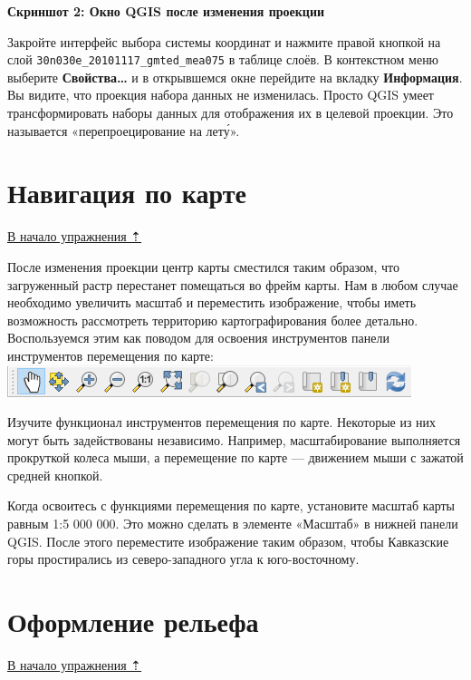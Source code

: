 \documentclass[
  12pt,
]{book}
\begin{document}
\textbf{Скриншот 2: Окно QGIS после изменения проекции}

Закройте интерфейс выбора системы координат и нажмите правой кнопкой на слой \texttt{30n030e\_20101117\_gmted\_mea075} в таблице слоёв. В контекстном меню выберите \textbf{Свойства\ldots{}} и в открывшемся окне перейдите на вкладку \textbf{Информация}. Вы видите, что проекция набора данных не изменилась. Просто QGIS умеет трансформировать наборы данных для отображения их в целевой проекции. Это называется «перепроецирование на лету́».

\hypertarget{map-design-general-navigation}{%
\section{Навигация по карте}\label{map-design-general-navigation}}

\protect\hyperlink{map-design-general}{В начало упражнения ⇡}

После изменения проекции центр карты сместился таким образом, что загруженный растр перестанет помещаться во фрейм карты. Нам в любом случае необходимо увеличить масштаб и переместить изображение, чтобы иметь возможность рассмотреть территорию картографирования более детально. Воспользуемся этим как поводом для освоения инструментов панели инструментов перемещения по карте:\\
\includegraphics{images/Ex01/NavigationPanel.png}

Изучите функционал инструментов перемещения по карте. Некоторые из них могут быть задействованы независимо. Например, масштабирование выполняется прокруткой колеса мыши, а перемещение по карте --- движением мыши с зажатой средней кнопкой.

Когда освоитесь с функциями перемещения по карте, установите масштаб карты равным 1:5 000 000. Это можно сделать в элементе «Масштаб» в нижней панели QGIS. После этого переместите изображение таким образом, чтобы Кавказские горы простирались из северо-западного угла к юго-восточному.

\hypertarget{map-design-general-relief}{%
\section{Оформление рельефа}\label{map-design-general-relief}}

\protect\hyperlink{map-design-general}{В начало упражнения ⇡}
\end{document}
